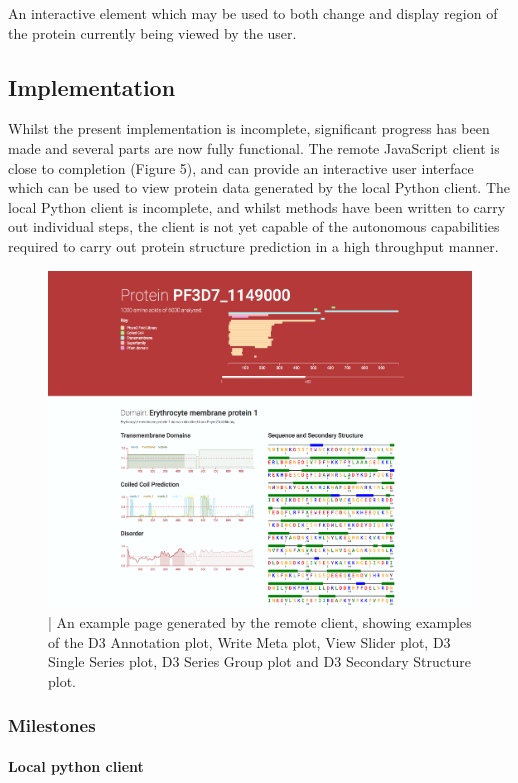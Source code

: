 \documentclass[fleqn,10pt]{article} %
\begin{document}
An interactive element which may be used to both change and display region of the protein currently being viewed by the user.

\subsection{Implementation}

Whilst the present implementation is incomplete, significant progress has been made and several parts are now fully functional. The remote JavaScript client is close to completion (Figure 5), and can provide an interactive user interface which can be used to view protein data generated by the local Python client. The local Python client is incomplete, and whilst methods have been written to carry out individual steps, the client is not yet capable of the autonomous capabilities required to carry out protein structure prediction in a high throughput manner.

\begin{figure}
\includegraphics[width=12cm]{figs/weball}
\caption{ | An example page generated by the remote client, showing examples of the D3 Annotation plot, Write Meta plot, View Slider plot, D3 Single Series plot, D3 Series Group plot and D3 Secondary Structure plot.}
\end{figure}

\subsubsection{Milestones}

\paragraph{Local python client}
\end{document}
